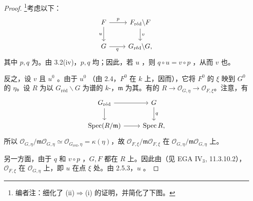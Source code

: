 \begin{proof}
\footnote{编者注：细化了 (ii)$\Rightarrow$(i) 的证明，并简化了下图。}考虑以下：
\[
\begin{tikzcd}
F\arrow[r,"p"]\arrow[d,"u"']&F_{\mathrm{r\text{é}d}}\backslash F\arrow[d,"v"]\\
G\arrow[r,"q"']&G_{\mathrm{r\text{é}d}}\backslash G,
\end{tikzcd}
\]
其中 $p,q$ 为。由 3.2(iv)，$p,q$ 均；因此，若 $u$ ，则 $q\circ u=v\circ p$ ，从而 $v$ 也。

反之，设 $v$ 且 $u^0$ 。由于 $u^0$ （由 2.4，$F^0$ 在 $k$ 上，因而），它将 $F^0$ 的 $\xi$ 映到 $G^0$ 的 $\eta$。设 $R$ 为以 $G_{\mathrm{r\text{é}d}}\backslash G$ 为谱的 $k$-，$\mathfrak m$ 为其。有的 $R\to\mathcal O_{G,\eta}\to\mathcal O_{F,\xi}$。注意，有
\[
\begin{tikzcd}
G_{\mathrm{r\text{é}d}}\arrow[r]\arrow[d]&G\arrow[d,"q"]\\
\operatorname{Spec}(R/\mathfrak m)\arrow[r]&\operatorname{Spec}R,
\end{tikzcd}
\]
所以 $\mathcal O_{G,\eta}/\mathfrak m\mathcal O_{G,\eta}\simeq\mathcal O_{G_{\mathrm{r\text{é}d}},\eta}=\kappa(\eta)$，故 $\mathcal O_{F,\xi}/\mathfrak m\mathcal O_{F,\xi}$ 在 $\mathcal O_{G,\eta}/\mathfrak m\mathcal O_{G,\eta}$ 上。

另一方面，由于 $q$ 和 $v\circ p$ ，$G,F$ 都在 $R$ 上。因此由（见 EGA IV$_3$, 11.3.10.2），$\mathcal O_{F,\xi}$ 在 $\mathcal O_{G,\eta}$ 上，即 $u$ 在点 $\xi$ 处。由 2.5.3，$u$ 。
\end{proof}

